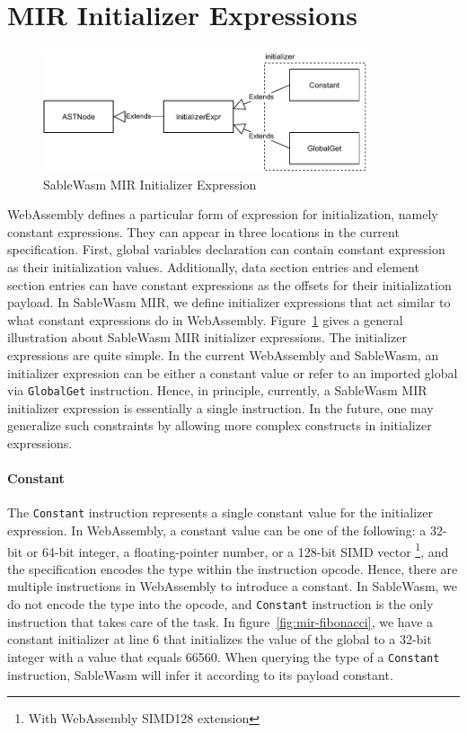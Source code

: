 \section{MIR Initializer Expressions}

\begin{figure}
  \centering
  \includegraphics[width=0.85\textwidth]{Images/4.MIR/initalizer-expression.pdf}
  \caption{SableWasm MIR Initializer Expression}
  \label{fig:sablewasm-mir-initializer-expression}
\end{figure}

WebAssembly defines a particular form of expression for initialization, namely
constant expressions. They can appear in three locations in the current
specification. First, global variables declaration can contain constant
expression as their initialization values. Additionally, data section entries
and element section entries can have constant expressions as the offsets for
their initialization payload. In SableWasm MIR, we define initializer
expressions that act similar to what constant expressions do in WebAssembly.
Figure~\ref{fig:sablewasm-mir-initializer-expression} gives a general
illustration about SableWasm MIR initializer expressions. The initializer
expressions are quite simple. In the current WebAssembly and SableWasm, an
initializer expression can be either a constant value or refer to an imported
global via \texttt{GlobalGet} instruction. Hence, in principle, currently,
a SableWasm MIR initializer expression is essentially a single instruction. In
the future, one may generalize such constraints by allowing more complex
constructs in initializer expressions.

\paragraph{Constant}
The \texttt{Constant} instruction represents a single constant value for the
initializer expression. In WebAssembly, a constant value can be one of the
following: a 32-bit or 64-bit integer, a floating-pointer number, or a 128-bit
SIMD vector \footnote{With WebAssembly SIMD128 extension}, and the specification
encodes the type within the instruction opcode. Hence, there are multiple
instructions in WebAssembly to introduce a constant. In SableWasm, we do not
encode the type into the opcode, and \texttt{Constant} instruction is the only
instruction that takes care of the task. In figure~\ref{fig:mir-fibonacci}, we
have a constant initializer at line 6 that initializes the value of the global
to a 32-bit integer with a value that equals 66560. When querying the type of a
\texttt{Constant} instruction, SableWasm will infer it according to its payload
constant.

